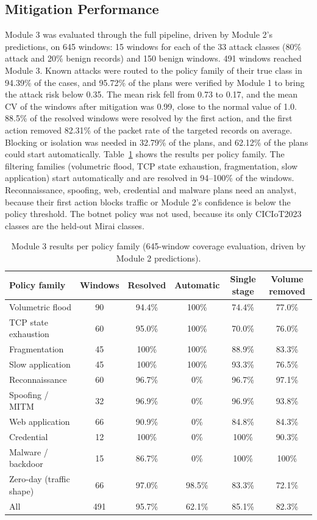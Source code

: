 \documentclass[]{interact}
\theoremstyle{plain}%
\theoremstyle{definition}
\theoremstyle{remark}
\begin{document}
\subsection{Mitigation Performance}
Module 3 was evaluated through the full pipeline, driven by Module 2's predictions, on 645 windows: 15 windows for each of the 33 attack classes (80\% attack and 20\% benign records) and 150 benign windows. 491 windows reached Module 3. Known attacks were routed to the policy family of their true class in 94.39\% of the cases, and 95.72\% of the plans were verified by Module 1 to bring the attack risk below 0.35. The mean risk fell from 0.73 to 0.17, and the mean CV of the windows after mitigation was 0.99, close to the normal value of 1.0. 88.5\% of the resolved windows were resolved by the first action, and the first action removed 82.31\% of the packet rate of the targeted records on average. Blocking or isolation was needed in 32.79\% of the plans, and 62.12\% of the plans could start automatically. Table~\ref{tab:m3family} shows the results per policy family. The filtering families (volumetric flood, TCP state exhaustion, fragmentation, slow application) start automatically and are resolved in 94--100\% of the windows. Reconnaissance, spoofing, web, credential and malware plans need an analyst, because their first action blocks traffic or Module 2's confidence is below the policy threshold. The botnet policy was not used, because its only CICIoT2023 classes are the held-out Mirai classes.

\begin{table}[h]
\centering
\caption{Module 3 results per policy family (645-window coverage evaluation, driven by Module 2 predictions).}
\label{tab:m3family}
\small
\begin{tabular}{lccccc}
\toprule
Policy family & Windows & Resolved & Automatic & Single stage & Volume removed \\
\midrule
Volumetric flood        & 90 & 94.4\%  & 100\% & 74.4\%  & 77.0\% \\
TCP state exhaustion    & 60 & 95.0\%  & 100\% & 70.0\%  & 76.0\% \\
Fragmentation           & 45 & 100\%   & 100\% & 88.9\%  & 83.3\% \\
Slow application        & 45 & 100\%   & 100\% & 93.3\%  & 76.5\% \\
Reconnaissance          & 60 & 96.7\%  & 0\%   & 96.7\%  & 97.1\% \\
Spoofing / MITM         & 32 & 96.9\%  & 0\%   & 96.9\%  & 93.8\% \\
Web application         & 66 & 90.9\%  & 0\%   & 84.8\%  & 84.3\% \\
Credential              & 12 & 100\%   & 0\%   & 100\%   & 90.3\% \\
Malware / backdoor      & 15 & 86.7\%  & 0\%   & 100\%   & 100\% \\
Zero-day (traffic shape)& 66 & 97.0\%  & 98.5\% & 83.3\% & 72.1\% \\
\midrule
All                     & 491 & 95.7\% & 62.1\% & 85.1\% & 82.3\% \\
\bottomrule
\end{tabular}
\end{table}
\end{document}
